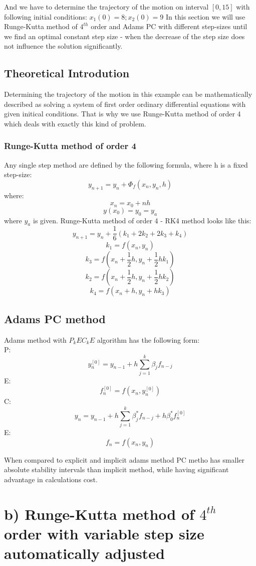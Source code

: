 \documentclass[12pt]{report}
\begin{document}
And we have to determine the trajectory of the motion on interval $[0, 15]$ with following initial conditions:
$ x_1(0) = 8; x_2(0) = 9 $
In this section we will use Runge-Kutta method of $4^{th}$ order and Adams PC with different step-sizes until we find an optimal constant step size - when the decrease of the step size does not influence the solution significantly.

\subsection{Theoretical Introdution}
Determining the trajectory of the motion in this example can be mathematically described as solving a system of first order ordinary differential equations with given initical conditions. That is why we use Runge-Kutta method of order 4 which deals with exactly this kind of problem.
\subsubsection{Runge-Kutta method of order 4}
Any single step method are defined by the following formula, where h is a fixed step-size:
\[ y_{n+1} = y_n + \Phi_f(x_n, y_n, h) \]
where:
\[ x_n = x_0 + nh \]
\[ y(x_0) = y_0 = y_a \]
where $y_a$ is given.
Runge-Kutta method of order 4 - RK4 method looks like this:
\[ y_{n+1} = y_n + \frac{1}{6}(k_1 + 2k_2+2k_3+k_4) \]
\[ k_1 = f(x_n, y_n) \]
\[ k_3 = f(x_n + \frac{1}{2}h, y_n + \frac{1}{2}hk_1) \]
\[ k_2 = f(x_n + \frac{1}{2}h, y_n + \frac{1}{2}hk_2) \]
\[ k_4 = f(x_n + h, y_n + hk_3) \]


\subsection{Adams PC method}
Adams method with $P_kEC_kE$ algorithm has the following form: \\
P: \[  y_n^{[0]} = y_{n-1} + h\sum_{j=1}^k \beta_jf_{n-j} \]
E: \[  f_n^{[0]} = f(x_n, y_n^{[0]}) \]
C: \[  y_n = y_{n-1} + h \sum_{j=1}^k \beta_j^* f_{n-j} + h \beta_0^* f_n^{[0]}\]
E: \[  f_n = f(x_n, y_n) \]

When compared to explicit and implicit adams method PC metho has smaller absolute stability intervals than implicit method, while having significant advantage in calculations cost.



\section{b) Runge-Kutta method of $4^{th}$ order with variable step size automatically adjusted}
\end{document}
